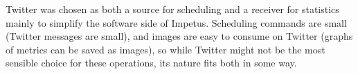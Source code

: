 Twitter was chosen as both a source for scheduling and a receiver for
statistics mainly to simplify the software side of Impetus. Scheduling
commands are small (Twitter messages are small), and images are easy
to consume on Twitter (graphs of metrics can be saved as images), so
while Twitter might not be the most sensible choice for these
operations, its nature fits both in some way.
